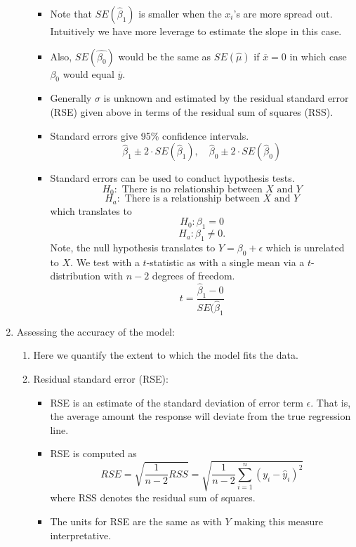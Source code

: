 \documentclass{article}
\begin{document}
\begin{enumerate}
\begin{enumerate}
\begin{itemize}
\item Note that $SE(\hat{\beta}_1)$ is smaller when the $x_i$'s are more spread out. Intuitively we have more leverage to estimate the slope in this case. 
\item Also, $SE(\hat{\beta_0})$ would be the same as $SE(\hat{\mu})$ if $\overline{x}=0$ in which case $\beta_0$ would equal $\overline{y}$.
\item Generally $\sigma$ is unknown and estimated by the residual standard error (RSE) given above in terms of the residual sum of squares (RSS).
\item Standard errors give 95\% confidence intervals.
\[
\hat{\beta}_1 \pm 2 \cdot SE(\hat{\beta}_1), \quad \hat{\beta}_0 \pm 2 \cdot SE(\hat{\beta}_0)
\]
\item Standard errors can be used to conduct hypothesis tests. 
\[
H_0: \text{ There is no relationship between $X$ and $Y$}
\]
\[
H_a: \text{ There is a relationship between $X$ and $Y$}
\]
which translates to 
\[
H_0: \beta_1=0
\]
\[
H_a: \beta_1 \neq 0.
\]
Note, the null hypothesis translates to $Y=\beta_0 + \epsilon$ which is unrelated to $X$. 
We test with a $t$-statistic as with a single mean via a $t$-distribution with $n-2$ degrees of freedom.
\[
t = \frac{\hat{\beta}_1-0}{SE(\hat{\beta}_1} 
\]

\end{itemize}
\end{enumerate}

\item Assessing the accuracy of the model:
\begin{enumerate}
\item Here we quantify the extent to which the model fits the data.
\item Residual standard error (RSE):
\begin{itemize}
\item RSE is an estimate of the standard deviation of error term $\epsilon$. That is, the average amount the response will deviate from the true regression line.
\item RSE is computed as
\[
RSE = \sqrt{\frac{1}{n-2}RSS} = \sqrt{\frac{1}{n-2} \sum_{i=1}^n (y_i-\hat{y}_i)^2}
\]
where RSS denotes the residual sum of squares.
\item The units for RSE are the same as with $Y$ making this measure interpretative.
\end{itemize}


\end{enumerate}
\end{enumerate}
\end{document}
